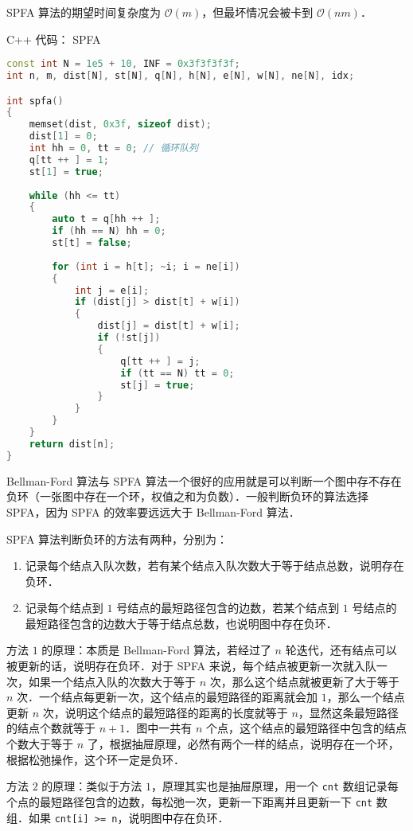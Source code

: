 SPFA 算法的期望时间复杂度为 $\mathcal{O}(m)$，但最坏情况会被卡到 $\mathcal{O}(nm)$．

C++ 代码：
SPFA

\begin{lstlisting}[language=cpp]
const int N = 1e5 + 10, INF = 0x3f3f3f3f;
int n, m, dist[N], st[N], q[N], h[N], e[N], w[N], ne[N], idx;

int spfa()
{
    memset(dist, 0x3f, sizeof dist);
    dist[1] = 0;
    int hh = 0, tt = 0; // 循环队列
    q[tt ++ ] = 1;
    st[1] = true;
    
    while (hh <= tt)
    {
        auto t = q[hh ++ ];
        if (hh == N) hh = 0;
        st[t] = false;
        
        for (int i = h[t]; ~i; i = ne[i])
        {
            int j = e[i];
            if (dist[j] > dist[t] + w[i])
            {
                dist[j] = dist[t] + w[i];
                if (!st[j])
                {
                    q[tt ++ ] = j;
                    if (tt == N) tt = 0;
                    st[j] = true;
                }
            }
        }
    }
    return dist[n];
}
\end{lstlisting}

Bellman-Ford 算法与 SPFA 算法一个很好的应用就是可以判断一个图中存不存在负环（一张图中存在一个环，权值之和为负数）．一般判断负环的算法选择 SPFA，因为 SPFA 的效率要远远大于 Bellman-Ford 算法．

SPFA 算法判断负环的方法有两种，分别为：

\begin{enumerate}
\item 记录每个结点入队次数，若有某个结点入队次数大于等于结点总数，说明存在负环．
\item 记录每个结点到 $1$ 号结点的最短路径包含的边数，若某个结点到 $1$ 号结点的最短路径包含的边数大于等于结点总数，也说明图中存在负环．
\end{enumerate}

方法 $1$ 的原理：本质是 Bellman-Ford 算法，若经过了 $n$ 轮迭代，还有结点可以被更新的话，说明存在负环．对于 SPFA 来说，每个结点被更新一次就入队一次，如果一个结点入队的次数大于等于 $n$ 次，那么这个结点就被更新了大于等于 $n$ 次．一个结点每更新一次，这个结点的最短路径的距离就会加 $1$，那么一个结点更新 $n$ 次，说明这个结点的最短路径的距离的长度就等于 $n$，显然这条最短路径的结点个数就等于 $n + 1$．图中一共有 $n$ 个点，这个结点的最短路径中包含的结点个数大于等于 $n$ 了，根据抽屉原理，必然有两个一样的结点，说明存在一个环，根据松弛操作，这个环一定是负环．

方法 $2$ 的原理：类似于方法 $1$，原理其实也是抽屉原理，用一个 \verb|cnt| 数组记录每个点的最短路径包含的边数，每松弛一次，更新一下距离并且更新一下 \verb|cnt| 数组．如果 \verb|cnt[i] >= n|，说明图中存在负环．

